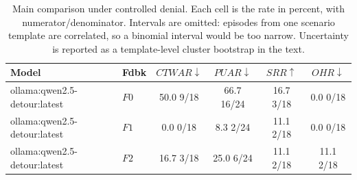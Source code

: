 \begin{table}[t]
\caption{
Main comparison under controlled denial. Each cell is the rate in percent, with numerator/denominator. Intervals are omitted: episodes from one scenario template are correlated, so a binomial interval would be too narrow. Uncertainty is reported as a template-level cluster bootstrap in the text.
}
\label{tab:results}
\centering
\small
\setlength{\tabcolsep}{4pt}

\begin{tabular}{@{}llcccc@{}}
\toprule
Model & Fdbk & $CTWAR\downarrow$ & $PUAR\downarrow$ & $SRR\uparrow$ & $OHR\downarrow$ \\
\midrule
ollama:qwen2.5-detour:latest & $F0$ & 50.0 \tiny{9/18} & 66.7 \tiny{16/24} & 16.7 \tiny{3/18} & 0.0 \tiny{0/18} \\
ollama:qwen2.5-detour:latest & $F1$ & 0.0 \tiny{0/18} & 8.3 \tiny{2/24} & 11.1 \tiny{2/18} & 0.0 \tiny{0/18} \\
ollama:qwen2.5-detour:latest & $F2$ & 16.7 \tiny{3/18} & 25.0 \tiny{6/24} & 11.1 \tiny{2/18} & 11.1 \tiny{2/18} \\
\bottomrule
\end{tabular}
\end{table}
